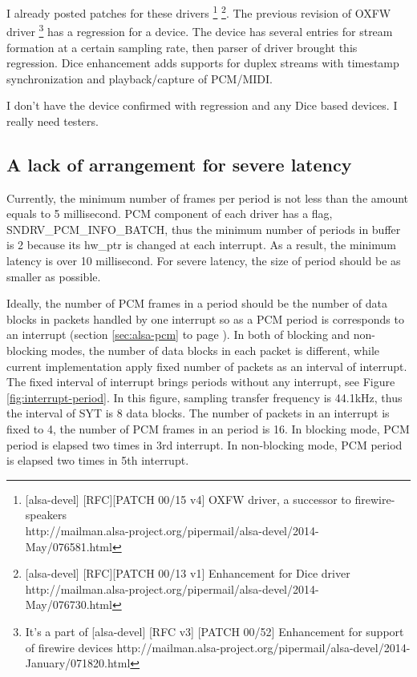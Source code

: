 \documentclass[onecolumn]{article}
\begin{document}
I already posted patches for these drivers \footnote{[alsa-devel] [RFC][PATCH 00/15 v4] OXFW driver, a successor to firewire-speakers \\ http://mailman.alsa-project.org/pipermail/alsa-devel/2014-May/076581.html} \footnote{[alsa-devel] [RFC][PATCH 00/13 v1] Enhancement for Dice driver \\ http://mailman.alsa-project.org/pipermail/alsa-devel/2014-May/076730.html}. The previous revision of OXFW driver \footnote{It's a part of [alsa-devel] [RFC v3] [PATCH 00/52] Enhancement for support of firewire devices http://mailman.alsa-project.org/pipermail/alsa-devel/2014-January/071820.html} has a regression for a device. The device has several entries for stream formation at a certain sampling rate, then parser of driver brought this regression. Dice enhancement adds supports for duplex streams with timestamp synchronization and playback/capture of PCM/MIDI.

I don't have the device confirmed with regression and any Dice based devices. I really need testers.

\subsection{A lack of arrangement for severe latency}
Currently, the minimum number of frames per period is not less than the amount equals to 5 millisecond. PCM component of each driver has a flag, SNDRV\_PCM\_INFO\_BATCH, thus the minimum number of periods in buffer is 2 because its hw\_ptr is changed at each interrupt. As a result, the minimum latency is over 10 millisecond. For severe latency, the size of period should be as smaller as possible.

Ideally, the number of PCM frames in a period should be the number of data blocks in packets handled by one interrupt so as a PCM period is corresponds to an interrupt (section \ref{sec:alsa-pcm} to page \pageref{sec:alsa-pcm}). In both of blocking and non-blocking modes, the number of data blocks in each packet is different, while current implementation apply fixed number of packets as an interval of interrupt. The fixed interval of interrupt brings periods without any interrupt, see Figure \ref{fig:interrupt-period}. In this figure, sampling transfer frequency is 44.1kHz, thus the interval of SYT is 8 data blocks. The number of packets in an interrupt is fixed to 4, the number of PCM frames in an period is 16. In blocking mode, PCM period is elapsed two times in 3rd interrupt. In non-blocking mode, PCM period is elapsed two times in 5th interrupt.
\end{document}
